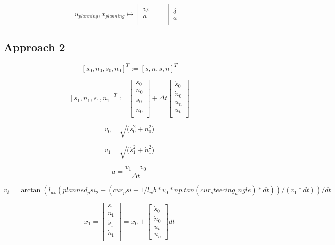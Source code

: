 \[
	u_{planning}, x_{planning} \mapsto \begin{bmatrix}
		v_\delta \\
		a        \\
	\end{bmatrix} = \begin{bmatrix}
		\dot{\delta} \\
		a            \\
	\end{bmatrix}
\]

\subsection{Approach 2}

\[
	[s_0, n_0, \dot{s}_0, \dot{n}_0]^T := [s, n, \dot{s}, \dot{n}]^T
\]

\[
	[s _1, n _1, \dot{s} _1, \dot{n} _1]^T := \begin{bmatrix}
		s_0       \\
		n_0       \\
		\dot{s}_0 \\
		\dot{n}_0 \\
	\end{bmatrix} + \Delta t \begin{bmatrix}
		\dot{s}_0 \\
		\dot{n}_0 \\
		u_n       \\
		u_t       \\
	\end{bmatrix}
\]

\[
	v_0 = \sqrt(\dot{s}_0^2 + \dot{n}_0^2)
\]

\[
	v_1 = \sqrt(\dot{s}_1^2 + \dot{n}_1^2)
\]

\[
	a = \frac{v_1 - v_0}{\Delta t}
\]

\[
	v_\delta = \arctan(l_{wb} (planned_psi_2 - (cur_psi + 1/l_wb * v_0 * np.tan(cur_steering_angle) * dt)) / (v_1 * dt)) / dt
\]

\pagebreak

\[
	x_1 = \begin{bmatrix}
		s_1 \\ n_1 \\ \dot{s}_1 \\ \dot{n}_1 \\
	\end{bmatrix} = x_0 + \begin{bmatrix}
		\dot{s}_0 \\ \dot{n}_0 \\ u_t \\ u_n
	\end{bmatrix} dt
\]

